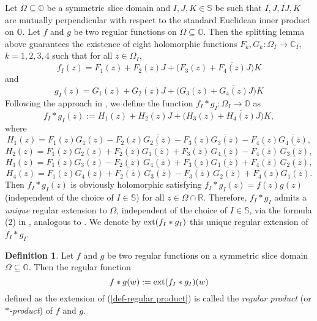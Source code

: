 \documentclass{amsart}
\theoremstyle{definition}
\newtheorem{definition}[theorem]{Definition}
\theoremstyle{remark}
\numberwithin{equation}{section}
\begin{document}
Let $\Omega\subseteq \mathbb O$ be a symmetric slice domain and $I, J,  K\in\mathbb S$ be such that  $I, J, IJ, K$ are mutually perpendicular with respect to the standard Euclidean inner product on $\mathbb O$. Let $f$ and $g$ be two regular functions on   $\Omega\subseteq \mathbb O$. Then the splitting lemma  above guarantees the existence of eight holomorphic functions $F_k, G_k: \Omega_I\rightarrow \mathbb C_I$, $k=1,2,3,4$ such that for all $z\in\Omega_I$,
\begin{equation*}\label{splitting of f}
f_I(z)=F_1(z)+F_2(z)J+\big(F_3(z)+\overline{F_4(z)}J\big)K
\end{equation*}
and
\begin{equation*}\label{splitting of g}
g_I(z)=G_1(z)+G_2(z)J+\big(G_3(z)+\overline{G_4(z)}J\big)K
\end{equation*}
Following the approach in \cite{CGSS}, we define the function $f_I\ast g_I:\Omega_I\rightarrow\mathbb O$ as
\begin{equation}\label{def-regular product}
f_I\ast g_I(z):=H_1(z)+H_2(z)J+\big(H_3(z)+\overline{H_4(z)}J\big)K,
\end{equation}
where
$$H_1(z)=F_1(z)G_1(z)-F_2(z)\overline{G_2(\overline{z})}
-F_3(z)\overline{G_3(\overline{z})}-F_4(z)\overline{G_4(\bar{z})}, $$
$$H_2(z)=F_1(z)G_2(z)+F_2(z)\overline{G_1(\bar{z})}
+\overline{F_3(\overline{z})}\,\overline{G_4(\overline{z})}
-\overline{F_4(\overline{z})}\,\overline{G_3(\overline{z})}, $$
$$H_3(z)=F_1(z)G_3(z)-\overline{F_2(\overline{z})}\,\overline{G_4(\overline{z})}
+F_3(z)\overline{G_1(\overline{z})}+
\overline{F_4(\overline{z})}\,\overline{G_2(\overline{z})}, $$
$$H_4(z)=F_1(z)G_4(z)+\overline{F_2(\bar{z})}\,\overline{G_3(\overline{z})}
-\overline{F_3(\bar{z})}\,\overline{G_2(\overline{z})}+F_4(z)\overline{G_1(\overline{z})}. $$
Then $f_I\ast g_I(z)$ is obviously holomorphic satisfying $f_I\ast g_I(z)=f(z)g(z)$ (independent of the choice of $I\in\mathbb S$) for all $z\in\Omega\cap\mathbb R$. Therefore, $f_I\ast g_I$ admits a \textit{unique} regular extension to $\Omega$, independent of the choice of $I\in\mathbb S$,  via the formula (2) in \cite[Proposition 6]{Ghiloni1}, analogous to  \cite[Lemma 4.4]{CGSS}. We denote  by ${\rm{ext}}(f_I\ast g_I)$ this unique regular extension of $f_I\ast g_I$.

\begin{definition}\label{R-product}
Let $f$ and $g$ be two regular functions on  a symmetric slice domain $\Omega\subseteq \mathbb O$. Then the regular function
$$f\ast g(w):={\rm{ext}}(f_I\ast g_I)(w)$$
defined as the extension of (\ref{def-regular product}) is called the \textit{regular product} (or \textit{$\ast$-product}) of $f$ and $g$.
\end{definition}
\end{document}
